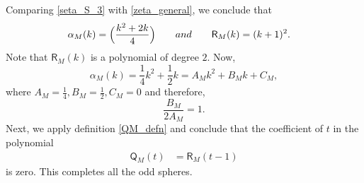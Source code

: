 \documentclass[11pt,lettersize,reqno,fullpage]{amsart}
\begin{document}
Comparing \eqref{seta_S_3} with \eqref{zeta_general}, we conclude that 
\begin{align}
\alpha_{M}(k)& = \Big(\frac{k^2+2k}{4}\Big) \qquad \textnormal{and} \qquad 
\mathsf{R}_{M}(k) = (k+1)^2.  
\end{align}
Note that $\mathsf{R}_{M}(k)$ is a polynomial of degree $2$. Now, 
\[\alpha_{M}(k)=\frac{1}{4}k^{2}+\frac{1}{2}k=A_{M}k^{2}+B_{M}k+C_{M}, \]
where $A_{M}=\frac{1}{4}, B_{M}=\frac{1}{2}, C_{M}=0 $ and therefore, 
\[\frac{B_{M}}{2 A_{M}}=1. \] 
Next, we apply definition \eqref{QM_defn} and conclude that the coefficient of $t$ in the polynomial
\begin{align}
\mathsf{Q}_{M}(t) & = \mathsf{R}_{M}(t-1)
\end{align}
is zero.
This completes all the odd spheres.
\end{document}
